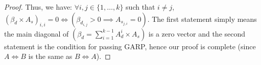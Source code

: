 \documentclass{article} %
\begin{document}
\begin{proof}
Thus, we have: $\forall i, j\in\{1,\ldots,k\}$ such that $i\not=j$, $(\beta_d\times A_s)_{i,i}=0 \iff (\beta_{d_{i,j}}>0 \implies A_{s_{j,i}}=0)$. The first statement simply means the main diagonal of $(\beta_d=\sum_{i=1}^{k-1}A_{d}^{i}\times A_s)$ is a zero vector and the second statement is the condition for passing GARP, hence our proof is complete (since $A\iff B$ is the same as $B\iff A$).
\end{proof}
\end{document}
